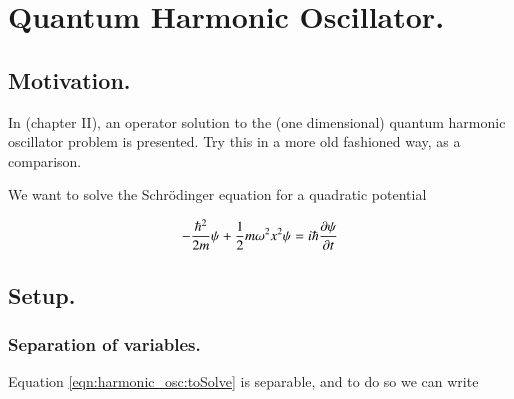 
%
%




\chapter{Quantum Harmonic Oscillator. }

%

\section{Motivation. }

In \cite{byron1992mca} (chapter II), an operator solution to the
(one dimensional) quantum
harmonic oscillator problem is presented.  Try this in a more old fashioned way,
as a comparison.

We want to solve the Schr\"{o}dinger equation for a quadratic potential

\begin{align}\label{eqn:harmonic_osc:toSolve}
-\frac{\hbar^2}{2m} \psi + \frac{1}{2} m \omega^2 x^2 \psi = i \hbar \frac{\partial {\psi}}{\partial {t}}
\end{align}

\section{Setup. }

\subsection{Separation of variables. }

Equation \ref{eqn:harmonic_osc:toSolve} is separable, and to do so we can write

